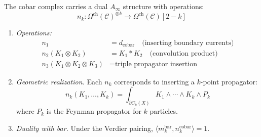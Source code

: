 \begin{theorem}\label{thm:cobar-ainfty-complete}
The cobar complex carries a dual $A_\infty$ structure with operations:
\[n_k: \Omega^{\mathrm{ch}}(\mathcal{C})^{\otimes k} \to \Omega^{\mathrm{ch}}(\mathcal{C})[2-k]\]

\begin{enumerate}
\item \emph{Operations:}
\begin{align}
n_1 &= d_{\mathrm{cobar}} \quad \text{(inserting boundary currents)} \\
n_2(K_1 \otimes K_2) &= K_1 * K_2 \quad \text{(convolution product)} \\
n_3(K_1 \otimes K_2 \otimes K_3) &= \text{triple propagator insertion}
\end{align}

\item \emph{Geometric realization.} Each $n_k$ corresponds to inserting a $k$-point propagator:
\[n_k(K_1, \ldots, K_k) = \int_{\partial C_k(X)} K_1 \wedge \cdots \wedge K_k \wedge P_k\]
where $P_k$ is the Feynman propagator for $k$ particles.

\item \emph{Duality with bar.} Under the Verdier pairing,
$\langle m_k^{\mathrm{bar}}, n_k^{\mathrm{cobar}} \rangle = 1$.
\end{enumerate}
\end{theorem}

